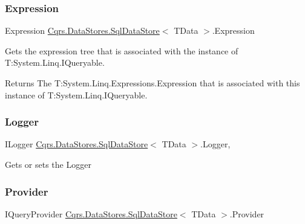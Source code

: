\subsubsection{\texorpdfstring{Expression}{Expression}}
{\footnotesize\ttfamily Expression \hyperlink{classCqrs_1_1DataStores_1_1SqlDataStore}{Cqrs.\+Data\+Stores.\+Sql\+Data\+Store}$<$ T\+Data $>$.Expression\hspace{0.3cm}{\ttfamily [get]}}



Gets the expression tree that is associated with the instance of T\+:\+System.\+Linq.\+I\+Queryable. 

\begin{DoxyReturn}{Returns}
The T\+:\+System.\+Linq.\+Expressions.\+Expression that is associated with this instance of T\+:\+System.\+Linq.\+I\+Queryable. 
\end{DoxyReturn}
\mbox{\label{classCqrs_1_1DataStores_1_1SqlDataStore_a44cd63b587e42b278177070eab8404f7}} 
\subsubsection{\texorpdfstring{Logger}{Logger}}
{\footnotesize\ttfamily I\+Logger \hyperlink{classCqrs_1_1DataStores_1_1SqlDataStore}{Cqrs.\+Data\+Stores.\+Sql\+Data\+Store}$<$ T\+Data $>$.Logger\hspace{0.3cm}{\ttfamily [get]}, {\ttfamily [protected]}}



Gets or sets the Logger 

\mbox{\label{classCqrs_1_1DataStores_1_1SqlDataStore_aec0093c6fe2adc41899c2418a0e324d9}} 
\subsubsection{\texorpdfstring{Provider}{Provider}}
{\footnotesize\ttfamily I\+Query\+Provider \hyperlink{classCqrs_1_1DataStores_1_1SqlDataStore}{Cqrs.\+Data\+Stores.\+Sql\+Data\+Store}$<$ T\+Data $>$.Provider\hspace{0.3cm}{\ttfamily [get]}}



